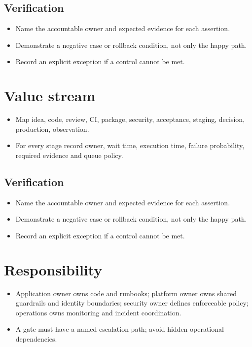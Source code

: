\documentclass[10pt,letterpaper]{article}
\begin{document}
\subsection{Verification}
\begin{itemize}
\item Name the accountable owner and expected evidence for each assertion.
\item Demonstrate a negative case or rollback condition, not only the happy path.
\item Record an explicit exception if a control cannot be met.
\end{itemize}


\section{Value stream}
\begin{itemize}
\item Map idea, code, review, CI, package, security, acceptance, staging, decision, production, observation.
\item For every stage record owner, wait time, execution time, failure probability, required evidence and queue policy.
\end{itemize}
\subsection{Verification}
\begin{itemize}
\item Name the accountable owner and expected evidence for each assertion.
\item Demonstrate a negative case or rollback condition, not only the happy path.
\item Record an explicit exception if a control cannot be met.
\end{itemize}


\section{Responsibility}
\begin{itemize}
\item Application owner owns code and runbooks; platform owner owns shared guardrails and identity boundaries; security owner defines enforceable policy; operations owns monitoring and incident coordination.
\item A gate must have a named escalation path; avoid hidden operational dependencies.
\end{itemize}
\end{document}

